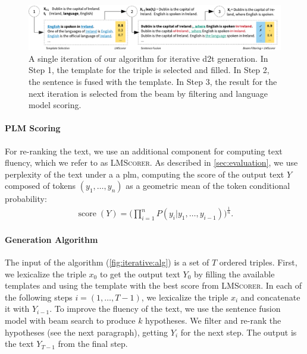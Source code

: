 \begin{figure}[t]
    \centering
    \includegraphics[width=\textwidth]{img/d2t_text_editing}
    \caption[Iterative data-to-text generation.]{A single iteration of our algorithm for iterative \ac{d2t} generation. In Step 1, the template for the triple is selected and filled. In Step 2, the sentence is fused with the template. In Step 3, the result for the next iteration is selected from the beam by filtering and language model scoring.}\label{fig:iterative:alg}
\end{figure}



\paragraph{PLM Scoring} For re-ranking the text, we use an additional component for computing text fluency, which we refer to as \textsc{LMScorer}.
As described in \autoref{sec:evaluation}, we use perplexity of the text under a a \ac{plm}, computing the score of the output text $Y$ composed of tokens $(y_1, \ldots, y_n)$ as a geometric mean of the token conditional probability:
\begin{align}
    \operatorname{score}(Y) = \Bigg( \prod_{i=1}^{n}{P(y_i|y_1, \ldots, y_{i-1})} \Bigg)^{\frac{1}{n}}.
\end{align}




\paragraph{Generation Algorithm}
The input of the algorithm (\autoref{fig:iterative:alg}) is a set of $T$ ordered triples. First, we lexicalize the triple $x_0$ to get the output text $Y_0$ by filling the available templates and using the template with the best score from \textsc{LMScorer}.
In each of the following steps $i=(1, \ldots, T-1)$, we lexicalize the triple $x_i$ and concatenate it with $Y_{i-1}$.  To improve the fluency of the text, we use the sentence fusion model with beam search to produce $k$ hypotheses. We filter and re-rank the hypotheses (see the next paragraph), getting $Y_{i}$ for the next step. The output is the text $Y_{T-1}$ from the final step.


